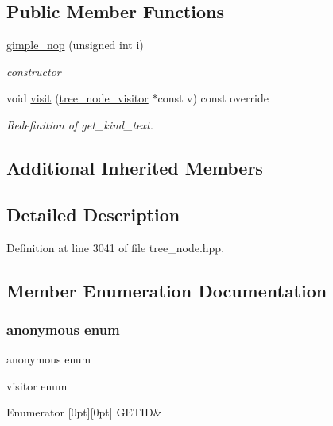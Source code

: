 \subsection*{Public Member Functions}
\begin{DoxyCompactItemize}
\item 
\hyperlink{structgimple__nop_aea8d9113e6467cf510fb1c6e1a4525bd}{gimple\+\_\+nop} (unsigned int i)
\begin{DoxyCompactList}\small\item\em constructor \end{DoxyCompactList}\item 
void \hyperlink{structgimple__nop_a332a68c582fd619f0fc2807fd90703d8}{visit} (\hyperlink{classtree__node__visitor}{tree\+\_\+node\+\_\+visitor} $\ast$const v) const override
\begin{DoxyCompactList}\small\item\em Redefinition of get\+\_\+kind\+\_\+text. \end{DoxyCompactList}\end{DoxyCompactItemize}
\subsection*{Additional Inherited Members}


\subsection{Detailed Description}


Definition at line 3041 of file tree\+\_\+node.\+hpp.



\subsection{Member Enumeration Documentation}
\mbox{\label{structgimple__nop_ae66f8186fb2fa09a8013797f85a2fc9d}} 
\subsubsection{\texorpdfstring{anonymous enum}{anonymous enum}}
{\footnotesize\ttfamily anonymous enum}



visitor enum 

\begin{DoxyEnumFields}{Enumerator}
[0pt][0pt]{}\mbox{\label{structgimple__nop_ae66f8186fb2fa09a8013797f85a2fc9daa518909b58e82c8fb6afb8a5be008fb7}} 
G\+E\+T\+ID&\\
\hline

\end{DoxyEnumFields}


